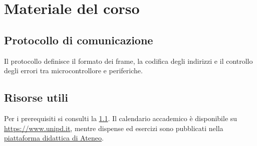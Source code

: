 \documentclass{../../../unipd-notes}
\begin{document}
\tableofcontents
\chapter{Materiale del corso}
\section{Protocollo di comunicazione}\label{sec:destination}
Il protocollo definisce il formato dei frame, la codifica degli indirizzi e il controllo degli errori tra microcontrollore e periferiche.
\section{Risorse utili}
Per i prerequisiti si consulti la \cref{sec:destination}. Il calendario accademico è disponibile su \url{https://www.unipd.it}, mentre dispense ed esercizi sono pubblicati nella \href{https://elearning.unipd.it}{piattaforma didattica di Ateneo}.
\end{document}
